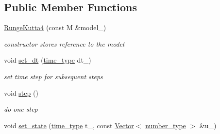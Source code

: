 \subsection*{Public Member Functions}
\begin{DoxyCompactItemize}
\item 
\hypertarget{classhdnum_1_1RungeKutta4_a576f1d99c638594c745b54956254c100}{
\hyperlink{classhdnum_1_1RungeKutta4_a576f1d99c638594c745b54956254c100}{RungeKutta4} (const M \&model\_\-)}
\label{classhdnum_1_1RungeKutta4_a576f1d99c638594c745b54956254c100}

\begin{DoxyCompactList}\small\item\em constructor stores reference to the model \item\end{DoxyCompactList}\item 
\hypertarget{classhdnum_1_1RungeKutta4_a035f34c6ac918a9ae8f0fd2bc67da620}{
void \hyperlink{classhdnum_1_1RungeKutta4_a035f34c6ac918a9ae8f0fd2bc67da620}{set\_\-dt} (\hyperlink{classhdnum_1_1RungeKutta4_accd5f055f7a407e0012622fbf4298e84}{time\_\-type} dt\_\-)}
\label{classhdnum_1_1RungeKutta4_a035f34c6ac918a9ae8f0fd2bc67da620}

\begin{DoxyCompactList}\small\item\em set time step for subsequent steps \item\end{DoxyCompactList}\item 
\hypertarget{classhdnum_1_1RungeKutta4_a243e063d6c0a8982a4addc1d97f547e0}{
void \hyperlink{classhdnum_1_1RungeKutta4_a243e063d6c0a8982a4addc1d97f547e0}{step} ()}
\label{classhdnum_1_1RungeKutta4_a243e063d6c0a8982a4addc1d97f547e0}

\begin{DoxyCompactList}\small\item\em do one step \item\end{DoxyCompactList}\item 
\hypertarget{classhdnum_1_1RungeKutta4_a06f337a2c23a40ea1cb798365879c9aa}{
void \hyperlink{classhdnum_1_1RungeKutta4_a06f337a2c23a40ea1cb798365879c9aa}{set\_\-state} (\hyperlink{classhdnum_1_1RungeKutta4_accd5f055f7a407e0012622fbf4298e84}{time\_\-type} t\_\-, const \hyperlink{classhdnum_1_1Vector}{Vector}$<$ \hyperlink{classhdnum_1_1RungeKutta4_a8a2af290f6503769876570bba58fdff2}{number\_\-type} $>$ \&u\_\-)}
\label{classhdnum_1_1RungeKutta4_a06f337a2c23a40ea1cb798365879c9aa}


\end{DoxyCompactItemize}
